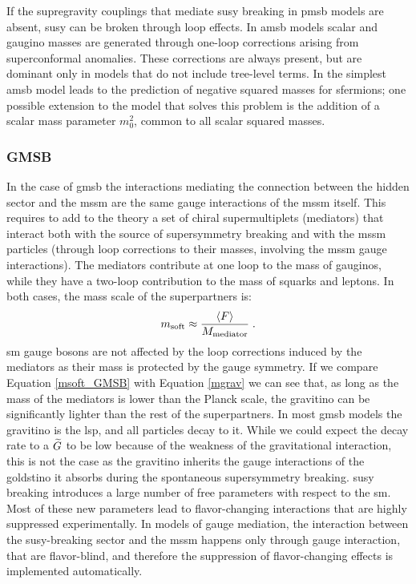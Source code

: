 If the supregravity couplings that mediate \gls{susy} breaking in \gls{pmsb} models are absent, \gls{susy} can be broken through loop effects. In \gls{amsb} models \cite{Randall:1998uk,Giudice:1998xp} scalar and gaugino masses are generated through one-loop corrections arising from superconformal anomalies. These corrections are always present, but are dominant only in models that do not include tree-level terms. In the simplest \gls{amsb} model leads to the prediction of negative squared masses for sfermions; one possible extension to the model that solves this problem is the addition of a scalar mass parameter $m_0^2$, common to all scalar squared masses. 

\subsubsection*{GMSB}

In the case of \gls{gmsb} \cite{Dine:1981gu, AlvarezGaume:1981wy, Nappi:1982hm, PhysRevD.48.1277, Dine:1994vc, Dine:1995ag} the interactions mediating the connection between the hidden sector and the \gls{mssm} are the same gauge interactions of the \gls{mssm} itself. This requires to add to the theory a set of chiral supermultiplets (mediators) that interact both with the source of supersymmetry breaking and with the \gls{mssm} particles (through loop corrections to their masses, involving the \gls{mssm} gauge interactions). The mediators contribute at one loop to the mass of gauginos, while they have a two-loop contribution to the mass of squarks and leptons. In both cases, the mass scale of the superpartners is:
\begin{equation}
m_{\rm{soft}} \approx \frac{\langle F \rangle}{M_\mathrm{mediator}} \; .
\label{msoft_GMSB}
\end{equation}
\gls{sm} gauge bosons are not affected by the loop corrections induced by the mediators as their mass is protected by the gauge symmetry.
If we compare Equation \ref{msoft_GMSB} with Equation \ref{mgrav} we can see that, as long as the mass of the mediators is lower than the Planck scale, the gravitino can be significantly lighter than the rest of the superpartners. In most \gls{gmsb} models the gravitino is the \gls{lsp}, and all particles decay to it. While we could expect the decay rate to a $\widetilde{G}$ to be low because of the weakness of the gravitational interaction, this is not the case as the gravitino inherits the gauge interactions of the goldstino it absorbs during the spontaneous supersymmetry breaking.  
\gls{susy} breaking introduces a large number of free parameters with respect to the \gls{sm}.
Most of these new parameters lead to flavor-changing interactions that are highly suppressed experimentally. 
In models of gauge mediation, the interaction between the \gls{susy}-breaking sector and the \gls{mssm} happens only through gauge interaction, that are flavor-blind, and therefore the suppression of flavor-changing effects is implemented automatically.




